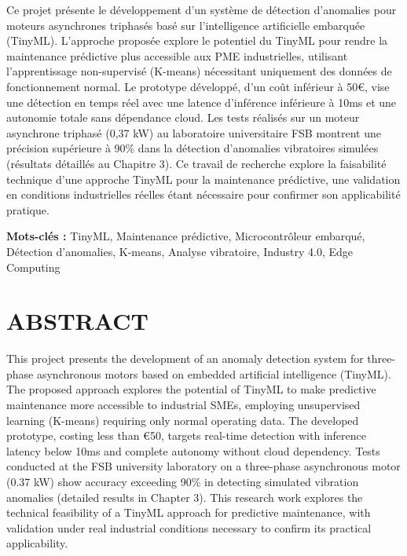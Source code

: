 \documentclass[oneside, french, a4paper, 12pt, reqno]{book}
\begin{document}
\begin{spacing}{1.3}
Ce projet présente le développement d'un système de détection d'anomalies pour moteurs asynchrones triphasés basé sur l'intelligence artificielle embarquée (TinyML). L'approche proposée explore le potentiel du TinyML pour rendre la maintenance prédictive plus accessible aux PME industrielles, utilisant l'apprentissage non-supervisé (K-means) nécessitant uniquement des données de fonctionnement normal. Le prototype développé, d'un coût inférieur à 50€, vise une détection en temps réel avec une latence d'inférence inférieure à 10ms et une autonomie totale sans dépendance cloud. Les tests réalisés sur un moteur asynchrone triphasé (0,37 kW) au laboratoire universitaire FSB montrent une précision supérieure à 90\% dans la détection d'anomalies vibratoires simulées (résultats détaillés au Chapitre 3). Ce travail de recherche explore la faisabilité technique d'une approche TinyML pour la maintenance prédictive, une validation en conditions industrielles réelles étant nécessaire pour confirmer son applicabilité pratique.\\[0.5cm]
\end{spacing}

\vspace{0.5cm}
\noindent\textbf{Mots-clés :} TinyML, Maintenance prédictive, Microcontrôleur embarqué, Détection d'anomalies, K-means, Analyse vibratoire, Industry 4.0, Edge Computing

\chapter*{ABSTRACT}
\thispagestyle{plain}

\begin{spacing}{1.3}
This project presents the development of an anomaly detection system for three-phase asynchronous motors based on embedded artificial intelligence (TinyML). The proposed approach explores the potential of TinyML to make predictive maintenance more accessible to industrial SMEs, employing unsupervised learning (K-means) requiring only normal operating data. The developed prototype, costing less than €50, targets real-time detection with inference latency below 10ms and complete autonomy without cloud dependency. Tests conducted at the FSB university laboratory on a three-phase asynchronous motor (0.37 kW) show accuracy exceeding 90\% in detecting simulated vibration anomalies (detailed results in Chapter 3). This research work explores the technical feasibility of a TinyML approach for predictive maintenance, with validation under real industrial conditions necessary to confirm its practical applicability.\\[0.5cm]
\end{spacing}
\end{document}
